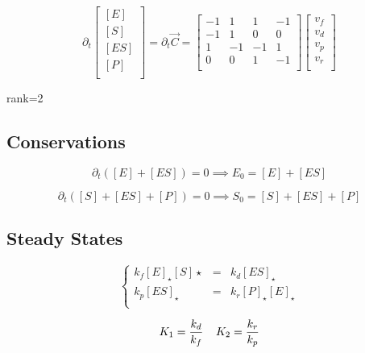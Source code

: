 \documentclass[aps,12pt]{revtex4}
\begin{document}
\begin{equation}
	\partial_t 
	\begin{bmatrix}
		[E]  \\
		[S]  \\
		[ES] \\
		[P]  \\
	\end{bmatrix}
	=	
	\partial_t \vec C = 
	\begin{bmatrix}
	-1 &  1 &  1 & -1 \\
	-1 &  1 &  0 &  0 \\
	 1 & -1 & -1 &  1 \\
	 0 &  0 &  1 & -1 \\
	\end{bmatrix}
	\begin{bmatrix}
		v_f\\
		v_d\\
		v_p\\
		v_r\\
	\end{bmatrix}
\end{equation}

rank=2

\subsection{Conservations}
\begin{equation}
	\partial_t ( [E] + [ES] ) = 0 \implies E_0 = [E] + [ES]
\end{equation}

\begin{equation}
	\partial_t ( [S] + [ES] + [P]) = 0 \implies S_0 = [S] + [ES] + [P]
\end{equation}

\subsection{Steady States}

\begin{equation}
\left\lbrace
\begin{array}{rcl}
	k_f [E]_\star[S]\star & = & k_d [ES]_\star\\
	k_p [ES]_\star        & = & k_r [P]_\star[E]_\star \\
\end{array}
\right.
\end{equation}

\begin{equation}
	K_1 = \dfrac{k_d}{k_f} \;\;\;\; K_2 = \dfrac{k_r}{k_p}\\
\end{equation}
\end{document}
